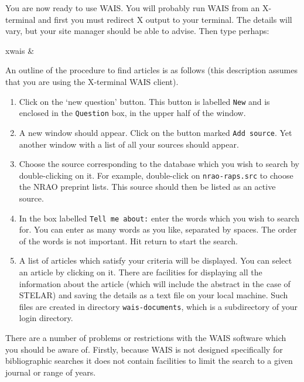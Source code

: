 \documentclass[twoside,11pt,nolof]{starlink}
\begin{document}
You are now ready to use WAIS. You will probably run WAIS from an
X-terminal and first you must redirect X output to your terminal. The
details will vary, but your site manager should be able to advise. Then
type perhaps:

\begin{terminalv}
xwais &
\end{terminalv}

An outline of the procedure to find articles is as follows (this
description assumes that you are using the X-terminal WAIS client).

\begin{enumerate}

  \item Click on the `new question' button. This button is labelled
   \texttt{New} and is enclosed in the \texttt{Question} box, in the upper
   half of the window.

  \item A new window should appear. Click on the button marked \texttt{Add source}. Yet another window with a list of all your sources
   should appear.

  \item Choose the source corresponding to the database which you wish
   to search by double-clicking on it. For example, double-click on
   \texttt{nrao-raps.src} to choose the NRAO preprint lists. This source
   should then be listed as an active source.

  \item In the box labelled \texttt{Tell me about:} enter the words which
   you wish to search for. You can enter as many words as you like,
   separated by spaces. The order of the words is not important. Hit
   return to start the search.

  \item A list of articles which satisfy your criteria will be
   displayed. You can select an article by clicking on it. There are
   facilities for displaying all the information about the article
   (which will include the abstract in the case of STELAR) and saving
   the details as a text file on your local machine. Such files are
   created in directory \texttt{wais-documents}, which is a subdirectory
   of your login directory.

\end{enumerate}

There are a number of problems or restrictions with the WAIS software
which you should be aware of. Firstly, because WAIS is not designed
specifically for bibliographic searches it does not contain facilities
to limit the search to a given journal or range of years.
\end{document}
